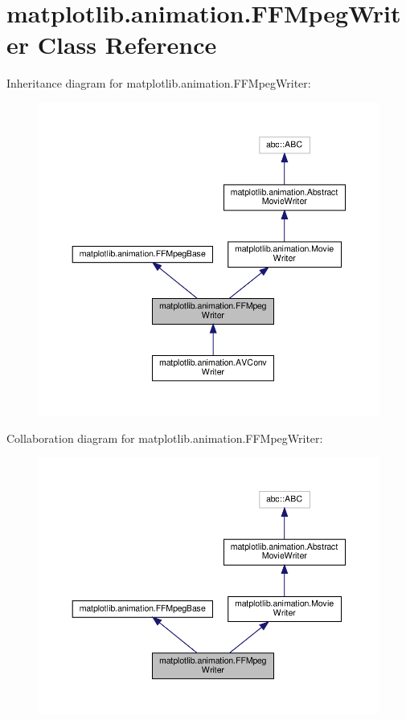 \hypertarget{classmatplotlib_1_1animation_1_1FFMpegWriter}{}\section{matplotlib.\+animation.\+F\+F\+Mpeg\+Writer Class Reference}
\label{classmatplotlib_1_1animation_1_1FFMpegWriter}


Inheritance diagram for matplotlib.\+animation.\+F\+F\+Mpeg\+Writer\+:
\nopagebreak
\begin{figure}[H]
\begin{center}
\leavevmode
\includegraphics[width=350pt]{classmatplotlib_1_1animation_1_1FFMpegWriter__inherit__graph}
\end{center}
\end{figure}


Collaboration diagram for matplotlib.\+animation.\+F\+F\+Mpeg\+Writer\+:
\nopagebreak
\begin{figure}[H]
\begin{center}
\leavevmode
\includegraphics[width=350pt]{classmatplotlib_1_1animation_1_1FFMpegWriter__coll__graph}
\end{center}
\end{figure}
